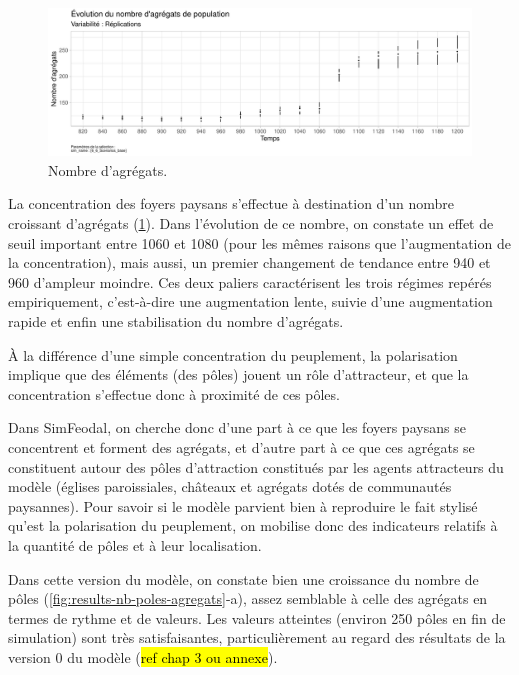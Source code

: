 \begin{figure}[H]
	\centering
	\includegraphics[width=\linewidth]{img/results_6_6/Agregats_Nb_Haut.pdf}
	\caption{Nombre d'agrégats.}
	\label{fig:results-nb-agregrats}
\end{figure}

La concentration des foyers paysans s'effectue à destination d'un nombre croissant d'agrégats (\cref{fig:results-nb-agregrats}).
Dans l'évolution de ce nombre, on constate un effet de seuil important entre 1060 et 1080 (pour les mêmes raisons que l'augmentation de la concentration), mais aussi, un premier changement de tendance entre 940 et 960 d'ampleur moindre.
Ces deux paliers caractérisent les trois régimes repérés empiriquement, c'est-à-dire une augmentation lente, suivie d'une augmentation rapide et enfin une stabilisation du nombre d'agrégats.

À la différence d'une simple concentration du peuplement, la polarisation implique que des éléments (des pôles) jouent un rôle d'attracteur, et que la concentration s'effectue donc à proximité de ces pôles.

Dans SimFeodal, on cherche donc d'une part à ce que les foyers paysans se concentrent et forment des agrégats, et d'autre part à ce que ces agrégats se constituent autour des pôles d'attraction constitués par les agents attracteurs du modèle (églises paroissiales, châteaux et agrégats dotés de communautés paysannes).
Pour savoir si le modèle parvient bien à reproduire le fait stylisé qu'est la polarisation du peuplement, on mobilise donc des indicateurs relatifs à la quantité de pôles et à leur localisation.

Dans cette version du modèle, on constate bien une croissance du nombre de pôles (\cref{fig:results-nb-poles-agregats}-a), assez semblable à celle des agrégats en termes de rythme et de valeurs.
Les valeurs atteintes (environ 250 pôles en fin de simulation) sont très satisfaisantes, particulièrement au regard des résultats de la version 0 du modèle (\hl{ref chap 3 ou annexe}).

